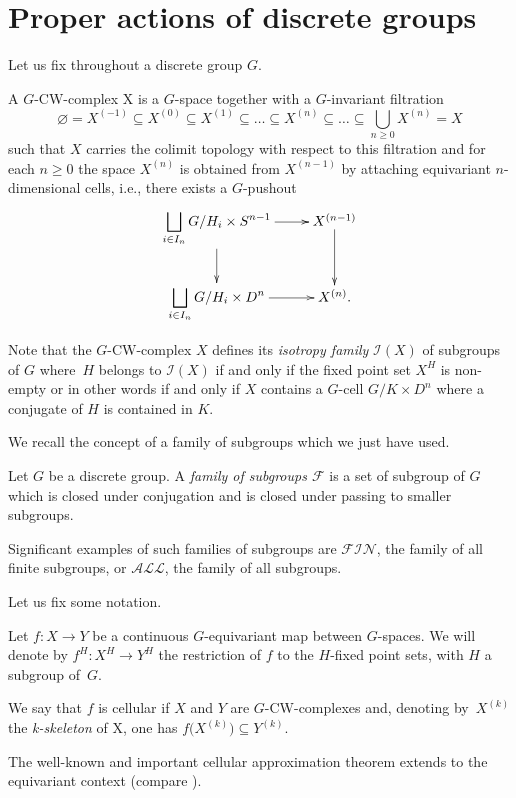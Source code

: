 \documentclass[pdftex]{sigma}
\numberwithin{equation}{section}
\begin{document}
\section{Proper actions of discrete groups}

Let us fix throughout a discrete group $G$.

\begin{Definition}
	A $G$-CW-complex X is a $G$-space together
	with a $G$-invariant filtration
	\[
\varnothing = X^{(-1)}\subseteq X^{(0)} \subseteq X^{(1)} \subseteq \dots \subseteq X^{(n)}\subseteq \dots \subseteq\bigcup_{n\geq0}X^{(n)}=X
\]
	such that $X$ carries the colimit topology with respect to this filtration and for each $n\geq0$
	the space $X^{(n)}$ is obtained from $X^{(n-1)}$ by attaching equivariant $n$-dimensional
	cells, i.e., there exists a $G$-pushout
	\[
	\xymatrix{\displaystyle\bigsqcup_{i\in I_n}G/H_i\times S^{n-1}\ar[r]\ar[d]& X^{(n-1)}\ar[d]\\
		\displaystyle\bigsqcup_{i\in I_n}G/H_i\times D^n\ar[r]& X^{(n)}.}
	\]
	
	Note that the $G$-CW-complex $X$ defines its \emph{isotropy family}
	$\mathcal{I}(X)$ of subgroups of $G$ where~$H$ belongs to $\mathcal{I}(X)$ if and
	only if the fixed point set $X^H$ is non-empty or in other words if and only
	if $X$ contains a $G$-cell $G/K\times D^n$ where a conjugate of $H$ is
	contained in $K$.
\end{Definition}

We recall the concept of a family of subgroups which we just have used.

\begin{Definition}
	Let $G$ be a discrete group. A \emph{family of subgroups $\mathcal{F}$} is a
	set of subgroup of $G$ which is closed under conjugation and is closed under passing
	to smaller subgroups.
	
	Significant examples of such families of subgroups are $\mathcal{FIN}$, the family of all finite subgroups, or
	$\mathcal{ALL}$, the family of all subgroups.
\end{Definition}


Let us fix some notation.
\begin{Definition}
	Let $f\colon X \rightarrow Y$ be a continuous $G$-equivariant map between
	$G$-spaces. We will denote by $f^H\colon X^H\to Y^H$ the restriction of $f$
	to the $H$-fixed point sets, with $H$ a subgroup of~$G$.
\end{Definition}

\begin{Definition}
	We say that $f$ is cellular if $X$ and $Y$ are $G$-CW-complexes and, denoting by~$X^{(k)}$ the \textit{k-skeleton} of X, one has $f\bigl(X^{(k)}\bigr) \subseteq Y^{(k)}$.
\end{Definition}
The well-known and important cellular approximation theorem extends to the equivariant context (compare \cite[Theorem~2.1]{ttd}).
\end{document}
